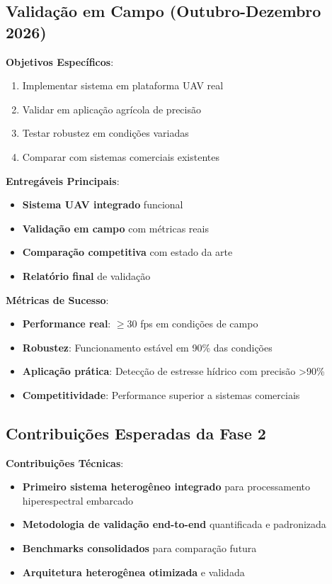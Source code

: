 \subsection{Validação em Campo (Outubro-Dezembro 2026)}\label{subsec:validacao_campo}

\textbf{Objetivos Específicos}:
\begin{enumerate}
    \item Implementar sistema em plataforma UAV real
    \item Validar em aplicação agrícola de precisão
    \item Testar robustez em condições variadas
    \item Comparar com sistemas comerciais existentes
\end{enumerate}

\textbf{Entregáveis Principais}:
\begin{itemize}
    \item \textbf{Sistema UAV integrado} funcional
    \item \textbf{Validação em campo} com métricas reais
    \item \textbf{Comparação competitiva} com estado da arte
    \item \textbf{Relatório final} de validação
\end{itemize}

\textbf{Métricas de Sucesso}:
\begin{itemize}
    \item \textbf{Performance real}: $\geq$30 fps em condições de campo
    \item \textbf{Robustez}: Funcionamento estável em 90\% das condições
    \item \textbf{Aplicação prática}: Detecção de estresse hídrico com precisão >90\%
    \item \textbf{Competitividade}: Performance superior a sistemas comerciais
\end{itemize}

\subsection{Contribuições Esperadas da Fase 2}\label{subsec:contribuicoes_fase2}

\textbf{Contribuições Técnicas}:
\begin{itemize}
    \item \textbf{Primeiro sistema heterogêneo integrado} para processamento hiperespectral embarcado
    \item \textbf{Metodologia de validação end-to-end} quantificada e padronizada
    \item \textbf{Benchmarks consolidados} para comparação futura
    \item \textbf{Arquitetura heterogênea otimizada} e validada
\end{itemize}

